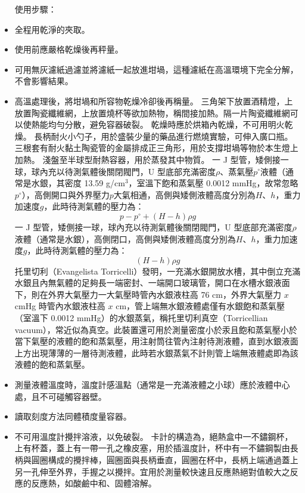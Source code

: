 \documentclass[a4paper,12pt]{article}
\begin{document}
\begin{itemize}
使用步驟：
\ben
\item 全程用乾淨的夾取。
\item 使用前應嚴格乾燥後再秤量。
\item 可用無灰濾紙過濾並將濾紙一起放進坩堝，這種濾紙在高溫環境下完全分解，不會影響結果。
\item 高溫處理後，將坩堝和所容物乾燥冷卻後再稱量。
\een
{}
三角架下放置酒精燈，上放置陶瓷纖維網，上放置燒杯等欲加熱物，稱間接加熱。隔一片陶瓷纖維網可以使熱能均勻分散，避免容器破裂。
乾燥時應於烘箱內乾燥，不可用明火乾燥。
長柄耐火小勺子，用於盛裝少量的藥品進行燃燒實驗，可伸入廣口瓶。
三根套有耐火黏土陶瓷管的金屬排成正三角形，用於支撐坩堝等物於本生燈上加熱。
淺盤至半球型耐熱容器，用於蒸發其中物質。
一 J 型管，矮側接一球，球內充以待測氣體後關閉閥門，U 型底部充滿密度$\rho$、蒸氣壓$p^{\circ}$液體（通常是水銀，其密度 13.59 g/cm$^3$，室溫下飽和蒸氣壓 0.0012 mmHg，故常忽略$p^{\circ}$），高側開口與外界壓力$p$大氣相通，高側與矮側液體高度分別為$H$、$h$，重力加速度$g$，此時待測氣體的壓力為：
\[p-p^{\circ}+(H-h)\rho g\]
一 J 型管，矮側接一球，球內充以待測氣體後關閉閥門，U 型底部充滿密度$\rho$液體（通常是水銀），高側閉口，高側與矮側液體高度分別為$H$、$h$，重力加速度$g$，此時待測氣體的壓力為：
\[(H-h)\rho g\]
托里切利（Evangelista Torricelli）發明，一充滿水銀開放水槽，其中倒立充滿水銀且內無氣體的足夠長一端密封、一端開口玻璃管，開口在水槽水銀液面下，則在外界大氣壓力一大氣壓時管內水銀液柱高 76 cm，外界大氣壓力 $x$ cmHg 時管內水銀液柱高 $x$ cm，管上端無水銀液體處僅有水銀飽和蒸氣壓（室溫下 0.0012 mmHg）的水銀蒸氣，稱托里切利真空（Torricellian vacuum），常近似為真空。此裝置還可用於測量密度小於汞且飽和蒸氣壓小於當下氣壓的液體的飽和蒸氣壓，用注射筒往管內注射待測液體，直到水銀液面上方出現薄薄的一層待測液體，此時若水銀蒸氣不計則管上端無液體處即為該液體的飽和蒸氣壓。
\bit
\item 測量液體溫度時，溫度計感溫點（通常是一充滿液體之小球）應於液體中心處，且不可碰觸容器壁。
\item 讀取刻度方法同體積度量容器。
\item 不可用溫度計攪拌溶液，以免破裂。
\eit
{}
卡計的構造為，絕熱盒中一不鏽鋼杯，上有杯蓋，蓋上有一帶一孔之橡皮塞，用於插溫度計，杯中有一不鏽鋼製由長柄與圓圈構成的攪拌棒，圓圈面與長柄垂直，圓圈在杯中，長柄上端通過蓋上另一孔伸至外界，手握之以攪拌。宜用於測量較快速且反應熱絕對值較大之反應的反應熱，如酸鹼中和、固體溶解。


\end{itemize}
\end{document}
